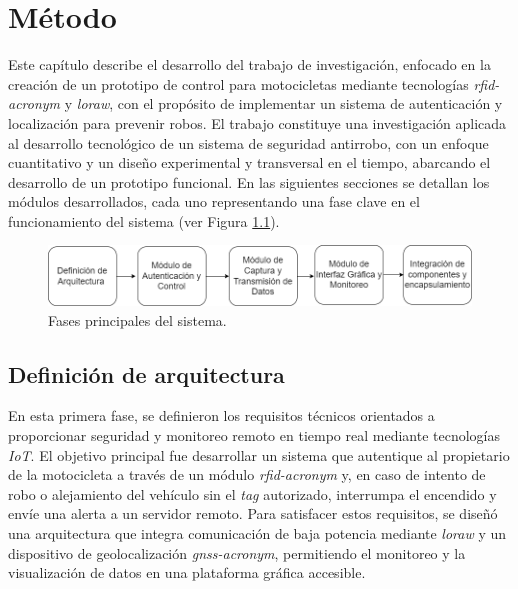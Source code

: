 \fancyhead{}
\fancyfoot{}
\pagestyle{plain}


\chapter{Método}

Este capítulo describe el desarrollo del trabajo de investigación, enfocado en la creación de un prototipo de control para motocicletas mediante tecnologías \textit{\acrshort{rfid-acronym}} y \textit{\acrshort{loraw}}, con el propósito de implementar un sistema de autenticación y localización para prevenir robos. El trabajo constituye una investigación aplicada al desarrollo tecnológico de un sistema de seguridad antirrobo, con un enfoque cuantitativo y un diseño experimental y transversal en el tiempo, abarcando el desarrollo de un prototipo funcional. En las siguientes secciones se detallan los módulos desarrollados, cada uno representando una fase clave en el funcionamiento del sistema (ver Figura \ref{modulo}).

\begin{figure}[H]
    \centering
    \includegraphics[width=\textwidth]{./capitulo_04/imagen/modulos.drawio.png}
    \caption{Fases principales del sistema.}
    \label{modulo}
\end{figure}

\section{Definición de arquitectura}

En esta primera fase, se definieron los requisitos técnicos orientados a proporcionar seguridad y monitoreo remoto en tiempo real mediante tecnologías \textit{IoT}. El objetivo principal fue desarrollar un sistema que autentique al propietario de la motocicleta a través de un módulo \textit{\acrshort{rfid-acronym}} y, en caso de intento de robo o alejamiento del vehículo sin el \textit{tag} autorizado, interrumpa el encendido y envíe una alerta a un servidor remoto. Para satisfacer estos requisitos, se diseñó una arquitectura que integra comunicación de baja potencia mediante \textit{\acrshort{loraw}} y un dispositivo de geolocalización \textit{\acrshort{gnss-acronym}}, permitiendo el monitoreo y la visualización de datos en una plataforma gráfica accesible.

